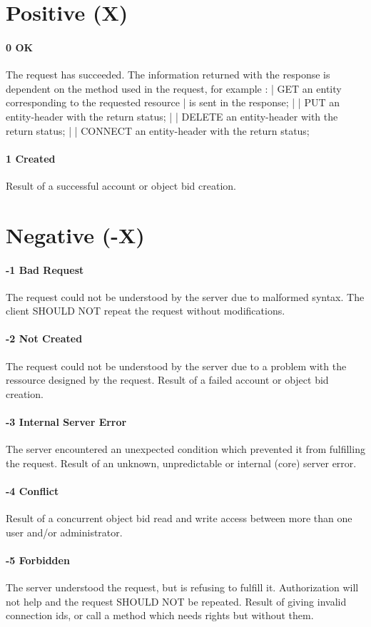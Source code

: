    \section{Positive (X)}
        \paragraph{0 OK}
The request has succeeded. The information returned with the
response is dependent on the method used in the request, for
example :
    | GET      an entity corresponding to the requested resource
    |          is sent in the response;
    |
    | PUT      an entity-header with the return status;
    |
    | DELETE   an entity-header with the return status;
    |
    | CONNECT  an entity-header with the return status;
        \paragraph{1 Created}
Result of a successful account or object bid creation.
    \section{Negative (-X)}
        \paragraph{-1 Bad Request}
The request could not be understood by the server due to malformed
syntax. The client SHOULD NOT repeat the request without
modifications.
        \paragraph{-2 Not Created}
The request could not be understood by the server due to a problem
with the ressource designed by the request.
Result of a failed account or object bid creation.
        \paragraph{-3 Internal Server Error}
The server encountered an unexpected condition which prevented it
from fulfilling the request.
Result of an unknown, unpredictable or internal (core) server error.
        \paragraph{-4 Conflict}
Result of a concurrent object bid read and write access between more
than one user and/or administrator.
        \paragraph{-5 Forbidden}
The server understood the request, but is refusing to fulfill it.
Authorization will not help and the request SHOULD NOT be repeated.
Result of giving invalid connection ids, or call a method which needs
rights but without them.


